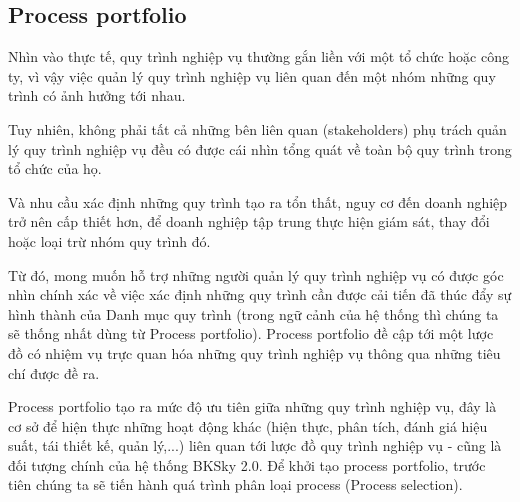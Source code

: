 \subsection{Process portfolio}

Nhìn vào thực tế, quy trình nghiệp vụ thường gắn liền với một tổ chức hoặc công ty, vì vậy việc quản lý quy trình nghiệp vụ liên quan đến một nhóm những quy trình có ảnh hưởng tới nhau. 

Tuy nhiên, không phải tất cả những bên liên quan (stakeholders) phụ trách quản lý quy trình nghiệp vụ đều có được cái nhìn tổng quát về toàn bộ quy trình trong tổ chức của họ.

Và nhu cầu xác định những quy trình tạo ra tổn thất, nguy cơ đến doanh nghiệp trở nên cấp thiết hơn, để doanh nghiệp tập trung thực hiện giám sát, thay đổi hoặc loại trừ nhóm quy trình đó.

Từ đó, mong muốn hỗ trợ những người quản lý quy trình nghiệp vụ có được góc nhìn chính xác về việc xác định những quy trình cần được cải tiến đã thúc đẩy sự hình thành của Danh mục quy trình (trong ngữ cảnh của hệ thống thì chúng ta sẽ thống nhất dùng từ Process portfolio). Process portfolio đề cập tới một lược đồ có nhiệm vụ trực quan hóa những quy trình nghiệp vụ thông qua những tiêu chí được đề ra.

Process portfolio tạo ra mức độ ưu tiên giữa những quy trình nghiệp vụ, đây là cơ sở để hiện thực những hoạt động khác (hiện thực, phân tích, đánh giá hiệu suất, tái thiết kế, quản lý,...) liên quan tới lược đồ quy trình nghiệp vụ - cũng là đối tượng chính của hệ thống BKSky 2.0. Để khởi tạo process portfolio, trước tiên chúng ta sẽ tiến hành quá trình phân loại process (Process selection).